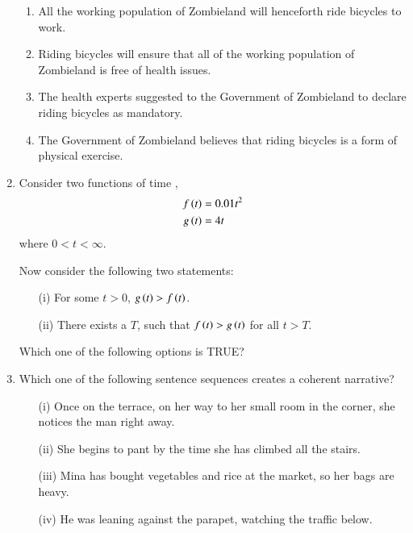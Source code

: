 \documentclass[journal,12pt,onecolumn]{IEEEtran}
\theoremstyle{remark}
\begin{document}
\begin{enumerate}
		\begin{enumerate}
			\item All the working population of Zombieland will henceforth ride bicycles to work.
			\item Riding bicycles will ensure that all of the working population of Zombieland is free of health issues.
			\item The health experts suggested to the Government of Zombieland to declare riding bicycles as mandatory.
			\item The Government of Zombieland believes that riding bicycles is a form of physical exercise.
		\end{enumerate}
		
		\item Consider two functions of time ,
		\begin{align*}
			f\left(t\right) &= 0.01 t^2 \\
			g\left(t\right) &= 4 t
		\end{align*}
		where $0 < t < \infty$.
		
		Now consider the following two statements:
		\begin{enumerate}
			\item[(i)] For some $t > 0$, $g\left(t\right) > f\left(t\right)$.
			\item[(ii)] There exists a $T$, such that $f\left(t\right) > g\left(t\right)$ for all $t > T$.
		\end{enumerate}
		Which one of the following options is TRUE?
		\hfill{}
		
		\begin{enumerate}
		\end{enumerate}
		
		\item Which one of the following sentence sequences creates a coherent narrative?
		\begin{enumerate}

				
			
			\item[(i)] Once on the terrace, on her way to her small room in the corner, she notices the man right away.
			\item[(ii)] She begins to pant by the time she has climbed all the stairs.
			\item[(iii)] Mina has bought vegetables and rice at the market, so her bags are heavy.
			\item[(iv)] He was leaning against the parapet, watching the traffic below.


\end{enumerate}
\end{enumerate}
\end{document}
